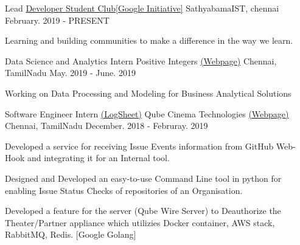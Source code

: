 

\begin{cventries}

  \cventry
    {Lead} %
    {\href{https://sites.google.com/view/sathyabamacodingclub}{Developer Student Club[Google Initiative]}} %
    {SathyabamaIST, chennai} %
    {February. 2019 - PRESENT} %
    {
      \begin{cvitems} %
        \item {Learning and building communities to make a difference in the way we learn.}
      \end{cvitems}
    }



  \cventry
    {Data Science and Analytics Intern}
    {Positive Integers \href{http://positiveintegers.com/}{(Webpage)}} %
    {Chennai, TamilNadu} %
    {May. 2019 - June. 2019} %
    {
      \begin{cvitems} %
        \item {Working on Data Processing and Modeling for Business Analytical Solutions}
      \end{cvitems}
    }
    
    
    
  \cventry
    {Software Engineer Intern \href{https://docs.google.com/spreadsheets/d/1dDO6C-KJg47RTLgM4caVn2qnPnrNxWdrVtkyauuFjb4/edit?usp=sharing}{(LogSheet)}} %
    {Qube Cinema Technologies \href{https://www.qubecinema.com/}{(Webpage)} } %
    {Chennai, TamilNadu} %
    {December. 2018 - Februray. 2019} %
    {
      \begin{cvitems} %
        \item {Developed a service for receiving Issue Events information from GitHub Web-Hook and integrating it for an Internal tool.}
        \item {Designed and Developed an easy-to-use Command Line tool in python for enabling Issue Status Checks of repositories of an Organisation.}
        \item {Developed a feature for the server (Qube Wire Server) to Deauthorize the Theater/Partner appliance which utilizies Docker container, AWS stack, RabbitMQ, Redis. [Google Golang]}
      \end{cvitems}
    }


\end{cventries}
